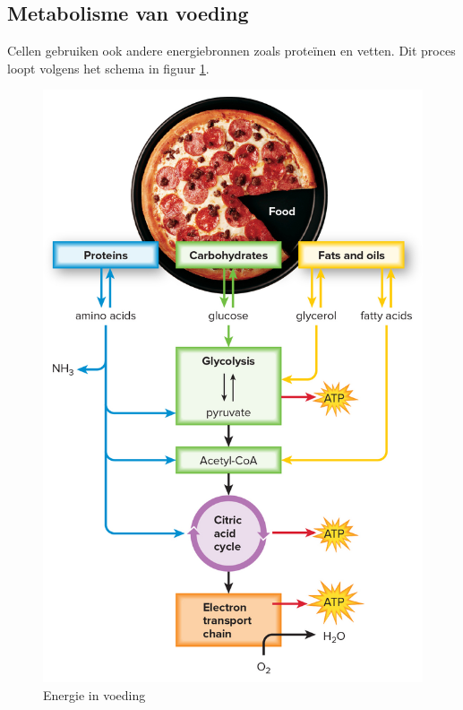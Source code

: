 \documentclass[a4paper,kul]{kulakarticle} %
\begin{document}
\subsection{Metabolisme van voeding}
Cellen gebruiken ook andere energiebronnen zoals proteïnen en vetten. Dit proces loopt volgens het schema in figuur \ref{fig:energieinvoeding}.
\begin{figure}[h]
	\centering
	\includegraphics[width=0.7\linewidth]{EnergieInVoeding}
	\caption[Energie in voeding]{Energie in voeding}
	\label{fig:energieinvoeding}
\end{figure}
\end{document}
